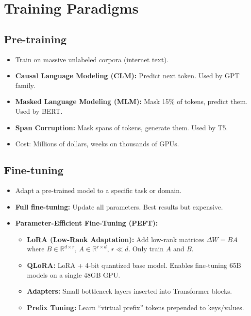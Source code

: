 \documentclass[11pt,a4paper]{article}
\begin{document}
\section{Training Paradigms}

\subsection{Pre-training}
\begin{itemize}[nosep]
  \item Train on massive unlabeled corpora (internet text).
  \item \textbf{Causal Language Modeling (CLM):} Predict next token. Used by GPT family.
  \item \textbf{Masked Language Modeling (MLM):} Mask 15\% of tokens, predict them. Used by BERT.
  \item \textbf{Span Corruption:} Mask spans of tokens, generate them. Used by T5.
  \item Cost: Millions of dollars, weeks on thousands of GPUs.
\end{itemize}

\subsection{Fine-tuning}
\begin{itemize}[nosep]
  \item Adapt a pre-trained model to a specific task or domain.
  \item \textbf{Full fine-tuning:} Update all parameters. Best results but expensive.
  \item \textbf{Parameter-Efficient Fine-Tuning (PEFT):}
    \begin{itemize}[nosep]
      \item \textbf{LoRA (Low-Rank Adaptation):} Add low-rank matrices $\Delta W = BA$ where $B \in \mathbb{R}^{d \times r}$, $A \in \mathbb{R}^{r \times d}$, $r \ll d$. Only train $A$ and $B$.
      \item \textbf{QLoRA:} LoRA + 4-bit quantized base model. Enables fine-tuning 65B models on a single 48GB GPU.
      \item \textbf{Adapters:} Small bottleneck layers inserted into Transformer blocks.
      \item \textbf{Prefix Tuning:} Learn ``virtual prefix'' tokens prepended to keys/values.
    \end{itemize}
\end{itemize}
\end{document}
